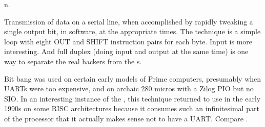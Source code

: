  n.

Transmission of data on a serial line, when accomplished by rapidly tweaking a
single output bit, in software, at the appropriate times. The technique is a
simple loop with eight OUT and SHIFT instruction pairs for each byte. Input is
more interesting. And full duplex (doing input and output at the same time) is
one way to separate the real hackers from the s.

Bit bang was used on certain early models of Prime computers, presumably when
UARTs were too expensive, and on archaic 280 micros with a Zilog PIO but no SIO.
In an interesting instance of the , this
technique returned to use in the early 1990s on some RISC architectures because
it consumes such an infinitesimal part of the processor that it actually makes
sense not to have a UART. Compare .

